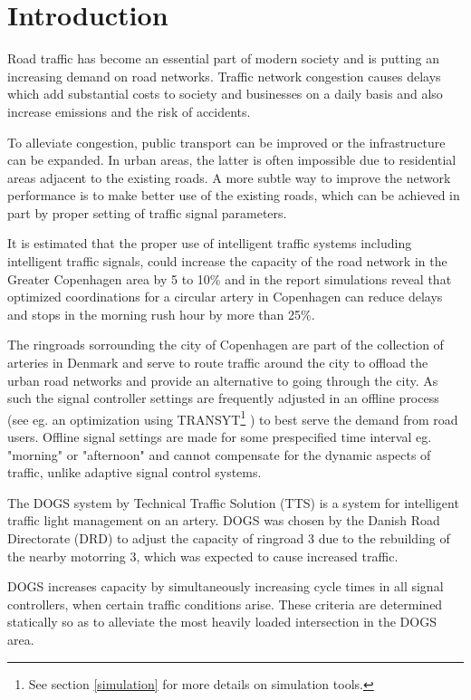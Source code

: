\section{Introduction}

Road traffic has become an essential part of modern society and is putting an increasing
demand on road networks.
Traffic network congestion causes delays which add substantial costs
to society and businesses on a daily basis and also increase emissions
and the risk of accidents.

To alleviate congestion, public transport can be improved or the
infrastructure can be expanded. In urban areas, the latter is often
impossible due to residential areas adjacent to the existing roads.  A
more subtle way to improve the network performance is to make better
use of the existing roads, which can be achieved in part by proper
setting of traffic signal parameters.

It is estimated that the proper use of intelligent traffic systems
including intelligent traffic signals, could increase the capacity of the
road network in the Greater Copenhagen area by 5 to 10\% and in the report \cite{bedresignaler} simulations reveal that optimized coordinations for a circular artery in Copenhagen can reduce delays and stops in the morning rush hour by more than 25\%.

The ringroads sorrounding the city of Copenhagen are part of the collection of arteries in Denmark and serve to route traffic around the city to offload the urban road networks and provide an alternative to going through the city. As such the signal controller settings are frequently adjusted in an offline process (see eg. an optimization using TRANSYT\footnote{See section \ref{simulation} for more details on simulation	tools.} \cite{transyt}) to best serve the demand from road users. Offline signal settings are made for some prespecified time interval eg. "morning" or "afternoon" and cannot compensate for the dynamic aspects of traffic, unlike adaptive signal control systems.

The DOGS system by Technical Traffic Solution (TTS) is a system for intelligent traffic light management on an artery. DOGS was chosen by the Danish Road Directorate (DRD) to adjust the capacity of ringroad 3 due to the rebuilding of the nearby motorring 3, which was expected to cause increased traffic.

DOGS increases capacity by simultaneously increasing cycle times in all signal controllers, when certain traffic conditions arise. These criteria are determined statically so as to alleviate the most heavily loaded intersection in the DOGS area.

